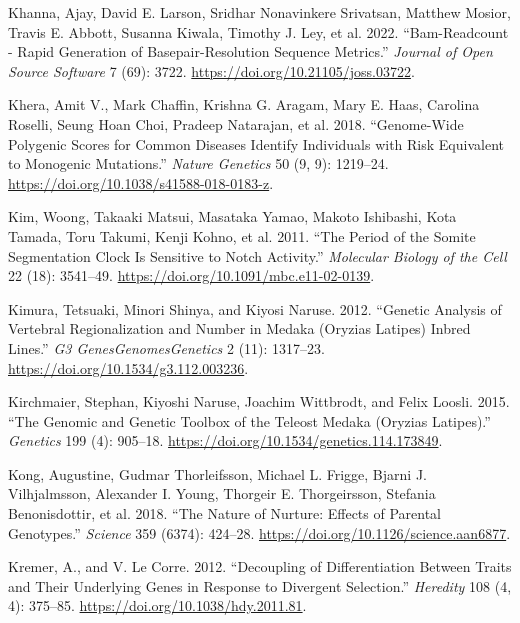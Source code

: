 \documentclass[
]{book}
\newlength{\cslhangindent}
\newlength{\cslentryspacingunit} %
\newenvironment{CSLReferences}[2] %
 {%
  \setlength{\parindent}{0pt}
  \ifodd #1
  \let\oldpar\par
  \def\par{\hangindent=\cslhangindent\oldpar}
  \fi
  \setlength{\parskip}{#2\cslentryspacingunit}
 }%
 {}
\begin{document}
\begin{CSLReferences}{1}{0}
\leavevmode{}%
Khanna, Ajay, David E. Larson, Sridhar Nonavinkere Srivatsan, Matthew Mosior, Travis E. Abbott, Susanna Kiwala, Timothy J. Ley, et al. 2022. {``Bam-Readcount - Rapid Generation of Basepair-Resolution Sequence Metrics.''} \emph{Journal of Open Source Software} 7 (69): 3722. \url{https://doi.org/10.21105/joss.03722}.

\leavevmode{}%
Khera, Amit V., Mark Chaffin, Krishna G. Aragam, Mary E. Haas, Carolina Roselli, Seung Hoan Choi, Pradeep Natarajan, et al. 2018. {``Genome-Wide Polygenic Scores for Common Diseases Identify Individuals with Risk Equivalent to Monogenic Mutations.''} \emph{Nature Genetics} 50 (9, 9): 1219--24. \url{https://doi.org/10.1038/s41588-018-0183-z}.

\leavevmode{}%
Kim, Woong, Takaaki Matsui, Masataka Yamao, Makoto Ishibashi, Kota Tamada, Toru Takumi, Kenji Kohno, et al. 2011. {``The Period of the Somite Segmentation Clock Is Sensitive to {Notch} Activity.''} \emph{Molecular Biology of the Cell} 22 (18): 3541--49. \url{https://doi.org/10.1091/mbc.e11-02-0139}.

\leavevmode{}%
Kimura, Tetsuaki, Minori Shinya, and Kiyosi Naruse. 2012. {``Genetic {Analysis} of {Vertebral Regionalization} and {Number} in {Medaka} ({Oryzias} Latipes) {Inbred Lines}.''} \emph{G3 Genes\textbar Genomes\textbar Genetics} 2 (11): 1317--23. \url{https://doi.org/10.1534/g3.112.003236}.

\leavevmode{}%
Kirchmaier, Stephan, Kiyoshi Naruse, Joachim Wittbrodt, and Felix Loosli. 2015. {``The {Genomic} and {Genetic Toolbox} of the {Teleost Medaka} ({Oryzias} Latipes).''} \emph{Genetics} 199 (4): 905--18. \url{https://doi.org/10.1534/genetics.114.173849}.

\leavevmode{}%
Kong, Augustine, Gudmar Thorleifsson, Michael L. Frigge, Bjarni J. Vilhjalmsson, Alexander I. Young, Thorgeir E. Thorgeirsson, Stefania Benonisdottir, et al. 2018. {``The Nature of Nurture: {Effects} of Parental Genotypes.''} \emph{Science} 359 (6374): 424--28. \url{https://doi.org/10.1126/science.aan6877}.

\leavevmode{}%
Kremer, A., and V. Le Corre. 2012. {``Decoupling of Differentiation Between Traits and Their Underlying Genes in Response to Divergent Selection.''} \emph{Heredity} 108 (4, 4): 375--85. \url{https://doi.org/10.1038/hdy.2011.81}.


\end{CSLReferences}
\end{document}
